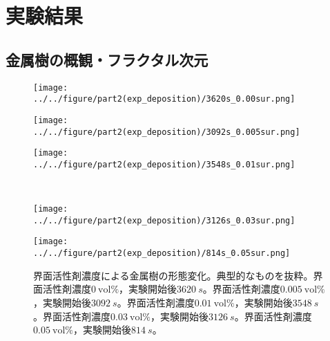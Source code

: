 \documentclass[autodetect-engine,dvi=dvipdfmx,a4paper,ja=standard,oneside,openany,11pt]{bxjsbook}
\begin{document}
\section{実験結果}
\subsection{金属樹の概観・フラクタル次元}

\begin{figure}[htbp]
  \begin{minipage}
    {0.32\textwidth}
    \subcaption{}
    \centering
    \texttt{[image: ../../figure/part2(exp\_deposition)/3620s\_0.00sur.png]}
    \label{fig:non_surfactant}
  \end{minipage}
  \begin{minipage}
    {0.32\textwidth}
    \subcaption{}
    \centering
    \texttt{[image: ../../figure/part2(exp\_deposition)/3092s\_0.005sur.png]}
    \label{fig:0.005_surfactant}
  \end{minipage}
  \begin{minipage}
    {0.32\textwidth}
    \subcaption{}
    \centering
    \texttt{[image: ../../figure/part2(exp\_deposition)/3548s\_0.01sur.png]}
    \label{fig:0.01_surfactant}
  \end{minipage}
  \\
  \begin{minipage}
    {0.32\textwidth}
    \subcaption{}
    \centering
    \texttt{[image: ../../figure/part2(exp\_deposition)/3126s\_0.03sur.png]}
    \label{fig:0.03_surfactant}
  \end{minipage}
  \begin{minipage}
    {0.32\textwidth}
    \subcaption{}
    \centering
    \texttt{[image: ../../figure/part2(exp\_deposition)/814s\_0.05sur.png]}
    \label{fig:0.05_surfactant}
  \end{minipage}
  \caption{界面活性剤濃度による金属樹の形態変化。典型的なものを抜粋。界面活性剤濃度$\SI{0}{\mathrm{vol}\%}$，実験開始後$\SI{3620}{s}$。界面活性剤濃度$\SI{0.005}{\mathrm{vol}\%}$，実験開始後$\SI{3092}{s}$。界面活性剤濃度$\SI{0.01}{\mathrm{vol}\%}$，実験開始後$\SI{3548}{s}$。界面活性剤濃度$\SI{0.03}{\mathrm{vol}\%}$，実験開始後$\SI{3126}{s}$。界面活性剤濃度$\SI{0.05}{\mathrm{vol}\%}$，実験開始後$\SI{814}{s}$。}
  \label{fig:surfactant}
\end{figure}
\end{document}
